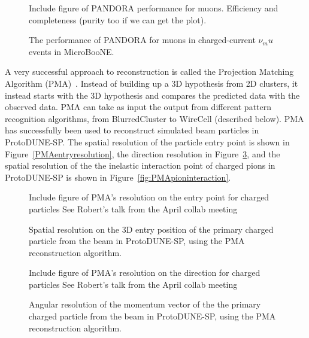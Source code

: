 \begin{figure}[htb]
\centering
Include figure of PANDORA performance for muons.  Efficiency and
completeness (purity too if we can get the plot).
\caption{The performance of PANDORA for muons in charged-current
  $\nu_mu$ events in MicroBooNE.  }
\label{fig:muonpandoraperf}
\end{figure}

A very successful approach to reconstruction is called the Projection
Matching Algorithm (PMA)~\cite{pma_algorithm}.  Instead of building up
a 3D hypothesis from 2D clusters, it instead starts with the 3D
hypothesis and compares the predicted data with the observed data.
PMA can take as input the output from different pattern recognition
algorithms, from BlurredCluster to WireCell (described below).  PMA
has successfully been used to reconstruct simulated beam particles in
ProtoDUNE-SP.  The spatial resolution of the particle entry point is
shown in Figure~\ref{PMAentryresolution}, the direction resolution in
Figure~\ref{fig:PMAdirection}, and the spatial resolution of the the
inelastic interaction point of charged pions in ProtoDUNE-SP is shown
in Figure~\ref{fig:PMApioninteraction}.

\begin{figure}[htb]
\centering
Include figure of PMA's resolution on the entry point for charged
particles See Robert's talk from the April collab meeting
\caption{Spatial resolution on the 3D entry position of the primary
  charged particle from the beam in ProtoDUNE-SP, using the PMA
  reconstruction algorithm.}
\label{fig:PMAentryresolution}
\end{figure}

\begin{figure}[htb]
\centering
Include figure of PMA's resolution on the direction for charged
particles See Robert's talk from the April collab meeting
\caption{Angular resolution of the momentum vector of the the primary
  charged particle from the beam in ProtoDUNE-SP, using the PMA
  reconstruction algorithm.}
\label{fig:PMAdirection}
\end{figure}

